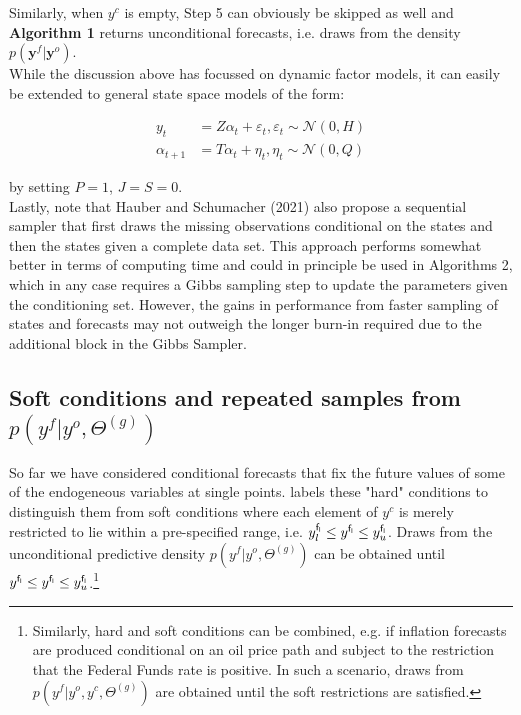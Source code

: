 \documentclass[notitlepage,a4paper,12pt]{article}
\begin{document}
Similarly, when $y^c$ is empty, Step 5 can obviously be skipped as well and \textbf{Algorithm 1} returns unconditional forecasts, i.e. draws from the density $p(\mathbf{y}^f | \mathbf{y}^o)$.\\

While the discussion above has focussed on dynamic factor models, it can easily be extended to general state space models of the form:

\begin{subequations}
    \label{eqn:statespacesys}
    \begin{align}
    y_t &= Z \alpha_t + \varepsilon_t, \varepsilon_t \sim \mathcal{N}(0, H) \\
    \alpha_{t+1} &= T \alpha_t + \eta_t, \eta_t \sim \mathcal{N}(0, Q) 
    \end{align}
\end{subequations}

by setting $P=1$, $J=S=0$.\\

Lastly, note that Hauber and Schumacher (2021) also propose a sequential sampler that first draws the missing observations conditional on the states and then the states given a complete data set. This approach performs somewhat better in terms of computing time and could in principle be used in Algorithms 2, which in any case requires a Gibbs sampling step to update the parameters given the conditioning set. However, the gains in performance from faster sampling of states and forecasts may not outweigh the longer burn-in required due to the additional block in the Gibbs Sampler.\\



\subsection{Soft conditions and repeated samples from $p(y^f|y^o, \Theta^{(g)})$}

So far we have considered conditional forecasts that fix the future values of some of the endogeneous variables at single points. \citet{waggonerzha1999_res} labels these "hard" conditions to distinguish them from soft conditions where each element of $y^c$ is merely restricted to lie within a pre-specified range, i.e. $y^{\sf{f}_l}_l \leq y^{\sf{f}_l} \leq y^{\sf{f}_l}_u$. Draws from the unconditional predictive density $p(y^f|y^o, \Theta^{(g)})$ can be obtained until $y^{\sf{f}_l} \leq y^{\sf{f}_l} \leq y^{\sf{f}_l}_u$.\footnote{Similarly, hard and soft conditions can be combined, e.g. if inflation forecasts are produced conditional on an oil price path and subject to the restriction that the Federal Funds rate is positive. In such a scenario, draws from $p(y^f|y^o, y^c, \Theta^{(g)})$ are obtained until the soft restrictions are satisfied.}\\
\end{document}

